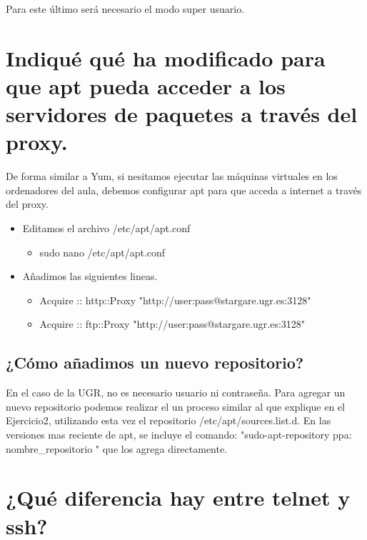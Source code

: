 Para este último será necesario el modo super usuario.

\cite{E4}


\section{Indiqué qué ha modificado para que apt pueda acceder a los servidores de paquetes a través del proxy.}
De forma similar a Yum, si nesitamos ejecutar las máquinas virtuales en los ordenadores del aula, debemos configurar apt para que acceda a internet a través del proxy.

\begin{itemize}
\item Editamos el archivo /etc/apt/apt.conf
	\begin{itemize}
	\item sudo nano /etc/apt/apt.conf
	\end{itemize}
\item Añadimos las siguientes lineas.
	\begin{itemize}
	\item Acquire :: http::Proxy "http://user:pass@stargare.ugr.es:3128"
	\item Acquire :: ftp::Proxy "http://user:pass@stargare.ugr.es:3128"	
	\end{itemize}
\end{itemize}

\cite{E5}

\subsection{¿Cómo añadimos un nuevo repositorio? }

En el caso de la UGR, no es necesario usuario ni contraseña. Para agregar un nuevo repositorio podemos realizar el un proceso similar al que explique en el Ejercicio2, utilizando esta vez el repositorio /etc/apt/sources.list.d.
En las versiones mas reciente de apt, se incluye el comando:
"sudo-apt-repository ppa: nombre\_repositorio " que los agrega directamente.
\cite{E6}

\section{¿Qué diferencia hay entre telnet y ssh?}

